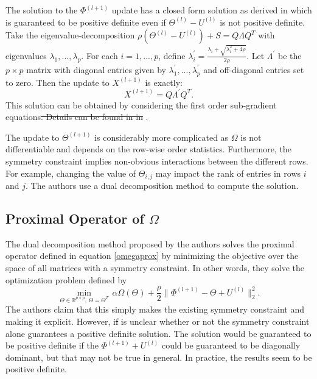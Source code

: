 \documentclass{uwstat572}
\newcommand{\vmdel}[1]{\sout{#1}}
\newcommand{\vmadd}[1]{\textbf{\color{red}{#1}}}
\theoremstyle{remark}
\theoremstyle{definition}
\begin{document}
The solution to the $\Phi^{(l+1)}$ update has a closed form solution as derived in \citep{Boyd2011}\vmadd{,}  which is guaranteed to be positive definite even if $\Theta^{(l)} - U^{(l)}$ is not positive definite.  Take the eigenvalue-decomposition $\rho(\Theta^{(l)} - U^{(l)}) + S =  Q \Lambda Q^T$ with eigenvalues $\lambda_1,...,\lambda_p$.  For each $i = 1,...,p$, define $\lambda^{\prime}_i = \frac{\lambda_i + \sqrt{\lambda_i^2 + 4\rho}}{2 \rho}$.  Let $\Lambda^{\prime}$ be the $p \times p$ matrix with diagonal entries given by $\lambda^{\prime}_1,...,\lambda^{\prime}_p$ and off-diagonal entries set to zero.  Then the update to $X^{(l+1)}$ is exactly:
\begin{equation*}
X^{(l+1)} = Q \Lambda^{\prime} Q^T.
\end{equation*}
This solution can be obtained by considering the first order sub-gradient equations\vmdel{.  Details can be found in in} \citep{Boyd2011}.

The update to $\Theta^{(l+1)}$ is considerably more complicated as $\Omega$ is not differentiable and depends on the row-wise order statistics.  Furthermore, the symmetry constraint implies non-obvious interactions between the different rows.  For example, changing the value of $\Theta_{i,j}$ may impact the rank of entries in rows $i$ and $j$. The authors use a dual decomposition method to compute the solution.  


\subsection{Proximal Operator of $\Omega$}

The dual decomposition method proposed by the authors solves the proximal operator defined in equation \eqref{omegaprox} by minimizing the objective over the space of all matrices with a symmetry constraint.  In other words, they solve the optimization problem defined by
\begin{equation}\label{dualdecomp}
\min_{\Theta \in \mathbb{R}^{p \times p}, \, \Theta = \Theta^T} \, \alpha \Omega(\Theta) + \frac{\rho}{2} \| \Phi^{(l+1)} - \Theta + U^{(l)} \|_2^2.
\end{equation}
The authors claim that this simply makes the existing symmetry constraint and making it explicit.  
However, i\vmdel{f}\vmadd{t} is unclear whether or not the symmetry constraint alone guarantees a positive definite solution.  The solution would be guaranteed to be positive definite if the $\Phi^{(l+1)} + U^{(l)}$ could be guaranteed to be diagonally dominant, but that may not be true in general.  In practice, the results seem to be positive definite.
\end{document}
